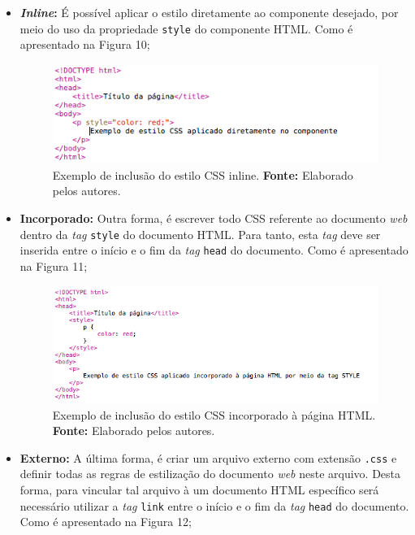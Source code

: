 \begin{itemize}
	\item \textbf{\textit{Inline}:} É possível aplicar o estilo diretamente ao componente desejado, por meio do uso da propriedade \texttt{style} do componente HTML. Como é apresentado na Figura 10;
	
	\newpage
	\begin{figure}[h!]
		\centerline{\includegraphics[scale=0.8]{./imagens/example_css_inline.png}}
		\caption[Exemplo de inclusão do estilo CSS inline]
		{Exemplo de inclusão do estilo CSS inline. \textbf{Fonte:} Elaborado pelos autores.}
		\label{fig:exemplo1}
	\end{figure}
	
	\item \textbf{Incorporado:} Outra forma, é escrever todo CSS referente ao  documento \textit{web} dentro da \textit{tag} \texttt{style} do documento HTML. Para tanto, esta \textit{tag} deve ser inserida entre o início e o fim da \textit{tag} \texttt{head} do documento. Como é apresentado na Figura 11;
	
	\begin{figure}[h!]
		\centerline{\includegraphics[scale=0.8]{./imagens/example_css_incorpored.png}}
		\caption[Exemplo de inclusão do estilo CSS incorporado à página HTML]
		{Exemplo de inclusão do estilo CSS incorporado à página HTML. \textbf{Fonte:} Elaborado pelos autores.}
		\label{fig:exemplo1}
	\end{figure}
	 
	\item \textbf{Externo:} A última forma, é criar um arquivo externo com extensão \texttt{.css} e definir todas as regras de estilização do documento \textit{web} neste arquivo. Desta forma, para vincular tal arquivo à um documento HTML específico será necessário utilizar a \textit{tag} \texttt{link} entre o início e o fim da \textit{tag} \texttt{head} do documento. Como é apresentado na Figura 12;
	

\end{itemize}
